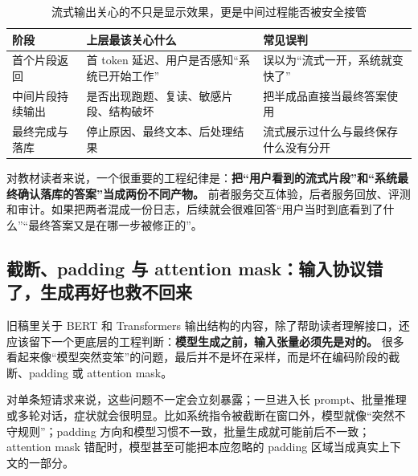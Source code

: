 \begin{table}[H]
\centering
\small
\begin{tabularx}{\textwidth}{>{\raggedright\arraybackslash}p{2.8cm}>{\raggedright\arraybackslash}p{3.2cm}>{\raggedright\arraybackslash}X}
\toprule
\textbf{阶段} & \textbf{上层最该关心什么} & \textbf{常见误判} \\
\midrule
首个片段返回 & 首 token 延迟、用户是否感知“系统已开始工作” & 误以为“流式一开，系统就变快了” \\
中间片段持续输出 & 是否出现跑题、复读、敏感片段、结构破坏 & 把半成品直接当最终答案使用 \\
最终完成与落库 & 停止原因、最终文本、后处理结果 & 流式展示过什么与最终保存什么没有分开 \\
\bottomrule
\end{tabularx}
\caption{流式输出关心的不只是显示效果，更是中间过程能否被安全接管}
\label{tab:streaming-concerns}
\end{table}

对教材读者来说，一个很重要的工程纪律是：\textbf{把“用户看到的流式片段”和“系统最终确认落库的答案”当成两份不同产物。} 前者服务交互体验，后者服务回放、评测和审计。如果把两者混成一份日志，后续就会很难回答“用户当时到底看到了什么”“最终答案又是在哪一步被修正的”。

\subsection{截断、padding 与 attention mask：输入协议错了，生成再好也救不回来}
旧稿里关于 BERT 和 Transformers 输出结构的内容，除了帮助读者理解接口，还应该留下一个更底层的工程判断：\textbf{模型生成之前，输入张量必须先是对的。} 很多看起来像“模型突然变笨”的问题，最后并不是坏在采样，而是坏在编码阶段的截断、padding 或 attention mask。

对单条短请求来说，这些问题不一定会立刻暴露；一旦进入长 prompt、批量推理或多轮对话，症状就会很明显。比如系统指令被截断在窗口外，模型就像“突然不守规则”；padding 方向和模型习惯不一致，批量生成就可能前后不一致；attention mask 错配时，模型甚至可能把本应忽略的 padding 区域当成真实上下文的一部分。

